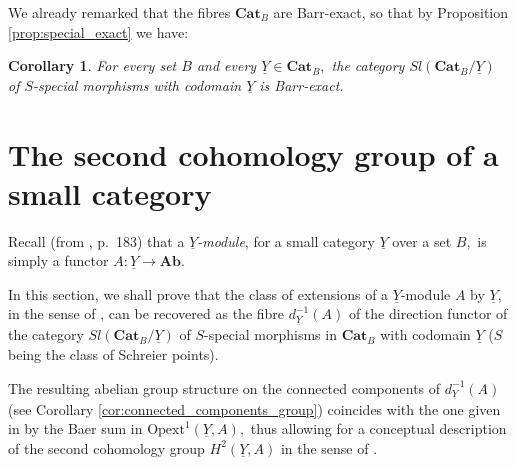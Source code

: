 \documentclass[11pt]{amsart}
\theoremstyle{plain}
\newtheorem{corollary}[subsubsection]{Corollary}
\theoremstyle{definition}
\theoremstyle{remark}
\newcommand{\un}{\underline}
\begin{document}
We already remarked that the fibres $\mathbf{Cat}_B$ are Barr-exact, so that by Proposition \ref{prop:special_exact} we have:
\begin{corollary}
\label{cor:S-special-exact}
For every set $B$ and every $\underline{Y}\in\mathbf{Cat}_B,$ the category $Sl(\mathbf{Cat}_B/\underline{Y})$ of $S$-special morphisms with codomain $\underline{Y}$ is Barr-exact.
\end{corollary}
\section{The second cohomology group of a small category} \label{section second cohomology CatB}
Recall (from \cite{cocat}, p.~183) that a $\underline{Y}$\emph{-module}, for a small category $\underline{Y}$ over a set $B,$ is simply a functor $A\colon\underline{Y}\rightarrow\mathbf{Ab}.$

In this section, we shall prove that the class of extensions of a $\underline{Y}$-module $A$ by $\underline{Y},$ in the sense of \cite{cocat, hoff}, can be recovered as the fibre $d_{\un{Y}}^{-1}(A)$ of the direction functor of the category $Sl(\mathbf{Cat}_B/\underline{Y})$ of $S$-special morphisms in $\mathbf{Cat}_B$ with codomain $\underline{Y}$ ($S$ being the class of Schreier points).

The resulting abelian group structure on the connected components of $d_{\un{Y}}^{-1}(A)$ (see Corollary \ref{cor:connected_components_group}) coincides with the one given in \cite{golasinski} by the Baer sum in $\mathrm{Opext}^1(\underline{Y},A),$ thus allowing for a conceptual description of the second cohomology group $H^2(\underline{Y},A)$ in the sense of \cite{cocat, golasinski, hoff}.
\end{document}
